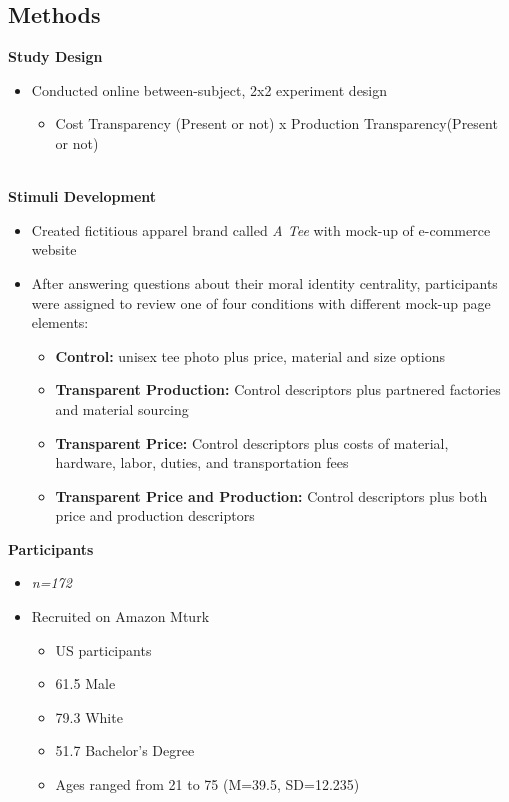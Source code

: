 \documentclass[a0,portrait]{a0poster}
\begin{document}
\begin{minipage}[c]{\linewidth}
\begin{framed}
\begin{multicols}{2}
\section*{Methods}
\color{Black}
\textbf{Study Design}
\begin{itemize}
\item Conducted online between-subject, 2x2 experiment design	
\begin{itemize}
    \item Cost Transparency (Present or not) x Production Transparency(Present or not) 
\end{itemize}
\end{itemize}
\\
\textbf{Stimuli Development}
\begin{itemize}
    \item Created fictitious apparel brand called \textit{A\text{\_} Tee} with mock-up of e-commerce website
    \item After answering questions about their moral identity centrality, participants were assigned to review one of four conditions with different mock-up page elements:
    \begin{itemize}
        \item \textbf{Control:} unisex tee photo plus price, material and size options
        \item \textbf{Transparent Production:} Control descriptors plus partnered factories and material sourcing
         \item \textbf{Transparent Price:} Control descriptors plus costs of material, hardware, labor, duties, and transportation fees
         \item \textbf{Transparent Price and Production:} Control descriptors plus both price and production descriptors
    \end{itemize}
\end{itemize}
\textbf{Participants}
\begin{itemize}
\item \textit{n=172}
\item Recruited on Amazon Mturk
\begin{itemize}
    \item US participants 
    \item 61.5\text{\%} Male
    \item 79.3\text{\%} White
    \item 51.7\text{\%} Bachelor's Degree
    \item Ages ranged from 21 to 75 (M=39.5, SD=12.235)
    \begin{itemize}

\end{itemize}
\end{itemize}
\end{itemize}
\end{multicols}
\end{framed}
\end{minipage}
\end{document}
